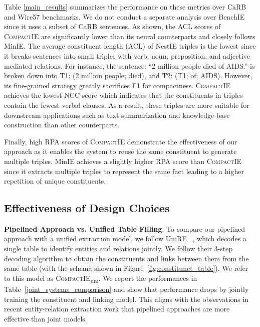 \documentclass[11pt,a4paper]{article}
\newcommand{\system}{{\textsc{CompactIE}}}
\begin{document}
Table \ref{main_results} summarizes the performance on these metrics over CaRB and Wire57 benchmarks. We do not conduct a separate analysis over BenchIE since it uses a subset of CaRB sentences. As shown, the ACL scores of \system{} are significantly lower than its neural counterparts and closely follows MinIE. The average constituent length (ACL) of NestIE triples is the lowest since it breaks sentences into small triples with verb, noun, preposition, and adjective mediated relations. For instance, the sentence: ``2 million people died of AIDS.'' is broken down into T1: (2 million people; died), and T2: (T1; of; AIDS). However, its fine-grained strategy greatly sacrifices F1 for compactness.  
\system{} achieves the lowest NCC score which indicates that the constituents in triples contain the fewest verbal clauses. As a result, these triples are more suitable for downstream applications such as text summarization and knowledge-base construction than other counterparts.

Finally, high RPA scores of \system{} demonstrate the effectiveness of our approach as it enables the system to reuse the same constituent to generate multiple triples. MinIE achieves a slightly higher RPA score than \system{} since it extracts multiple triples to represent the same fact leading to a higher repetition of unique constituents.

\subsection{Effectiveness of Design Choices}
\noindent
{\textbf{Pipelined Approach vs. Unified Table Filling}.}
To compare our pipelined approach with a unified extraction model, we follow UniRE ~\cite{wang2021unire}, which decodes a single table to identify entities and relations jointly. We follow their 3-step decoding algorithm to obtain the constituents and links between them from the same table (with the schema shown in Figure~\ref{fig:constitunet_table}). We refer to this model as \system{}\textsubscript{uni}. We report the performances in  Table~\ref{joint_systems_comparison} and show that performance drops by jointly training the constituent and linking model. This aligns with the observations in recent entity-relation extraction work that pipelined approaches are more effective than joint models.
\end{document}
